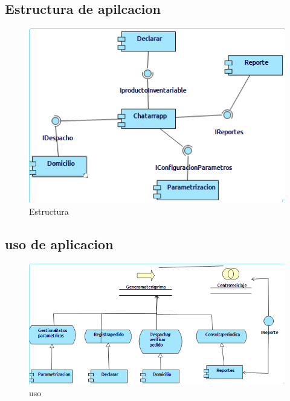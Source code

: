 \subsection{Estructura de apilcacion}
\begin{figure}[h!]
	\centering
	\includegraphics[width=0.8\linewidth]{Arquitectura/Aplicacion/imgs/Estructura de apilcacion.png}
	\caption{Estructura}
\end{figure}
\newpage

\subsection{uso de aplicacion}
\begin{figure}[h!]
	\centering
	\includegraphics[width=0.8\linewidth]{Arquitectura/Aplicacion/imgs/uso de aplicacion.png}
	\caption{uso}
\end{figure}
\newpage

